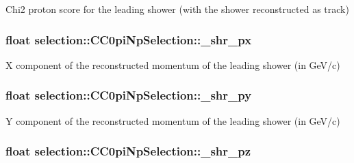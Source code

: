 Chi2 proton score for the leading shower (with the shower reconstructed as track) \hypertarget{classselection_1_1CC0piNpSelection_a52e2043c82f5de7f93ac9bad63563f18}{
\subsubsection[{\-\_\-shr\-\_\-px}]{\setlength{\rightskip}{0pt plus 5cm}float selection\-::\-C\-C0pi\-Np\-Selection\-::\-\_\-shr\-\_\-px\hspace{0.3cm}{\ttfamily [private]}}}\label{classselection_1_1CC0piNpSelection_a52e2043c82f5de7f93ac9bad63563f18}
X component of the reconstructed momentum of the leading shower (in Ge\-V/c) \hypertarget{classselection_1_1CC0piNpSelection_a436dd7081c84003dabb595289d745111}{
\subsubsection[{\-\_\-shr\-\_\-py}]{\setlength{\rightskip}{0pt plus 5cm}float selection\-::\-C\-C0pi\-Np\-Selection\-::\-\_\-shr\-\_\-py\hspace{0.3cm}{\ttfamily [private]}}}\label{classselection_1_1CC0piNpSelection_a436dd7081c84003dabb595289d745111}
Y component of the reconstructed momentum of the leading shower (in Ge\-V/c) \hypertarget{classselection_1_1CC0piNpSelection_a769319ad32b6ce49c7a5283b246303fa}{
\subsubsection[{\-\_\-shr\-\_\-pz}]{\setlength{\rightskip}{0pt plus 5cm}float selection\-::\-C\-C0pi\-Np\-Selection\-::\-\_\-shr\-\_\-pz\hspace{0.3cm}{\ttfamily [private]}}}\label{classselection_1_1CC0piNpSelection_a769319ad32b6ce49c7a5283b246303fa}
